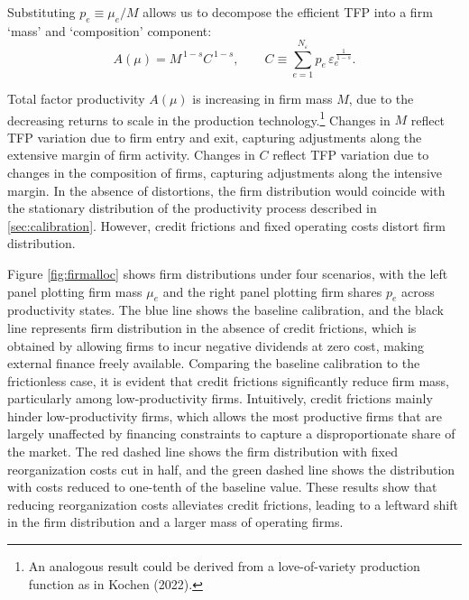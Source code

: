 \documentclass[12pt]{article}
\begin{document}
Substituting $p_e \equiv \mu_e/M$ allows us to decompose the efficient TFP into a firm `mass' and `composition' component:
$$ A(\mu)= M^{\,1-s}C^{\,1-s},\qquad 
   C \equiv \sum_{e=1}^{N_\varepsilon} p_e\,\varepsilon_e^{\,\frac{1}{1-s}}. $$

Total factor productivity $A(\mu)$ is increasing in firm mass $M$, due to the decreasing returns to scale in the production technology.\footnote{An analogous result could be derived from a love-of-variety production function as in Kochen (2022).} Changes in $M$ reflect TFP variation due to firm entry and exit, capturing adjustments along the extensive margin of firm activity. Changes in $C$ reflect TFP variation due to changes in the composition of firms, capturing adjustments along the intensive margin. In the absence of distortions, the firm distribution would coincide with the stationary distribution of the productivity process described in \ref{sec:calibration}. However, credit frictions and fixed operating costs distort firm distribution.

Figure \ref{fig:firmalloc} shows firm distributions under four scenarios, with the left panel plotting firm mass $ \mu_e $ and the right panel plotting firm shares $ p_e $ across productivity states. The blue line shows the baseline calibration, and the black line represents firm distribution in the absence of credit frictions, which is obtained by allowing firms to incur negative dividends at zero cost, making external finance freely available. Comparing the baseline calibration to the frictionless case, it is evident that credit frictions significantly reduce firm mass, particularly among low-productivity firms. Intuitively, credit frictions mainly hinder low-productivity firms, which allows the most productive firms that are largely unaffected by financing constraints to capture a disproportionate share of the market. The red dashed line shows the firm distribution with fixed reorganization costs cut in half, and the green dashed line shows the distribution with costs reduced to one-tenth of the baseline value. These results show that reducing reorganization costs alleviates credit frictions, leading to a leftward shift in the firm distribution and a larger mass of operating firms.
\end{document}
